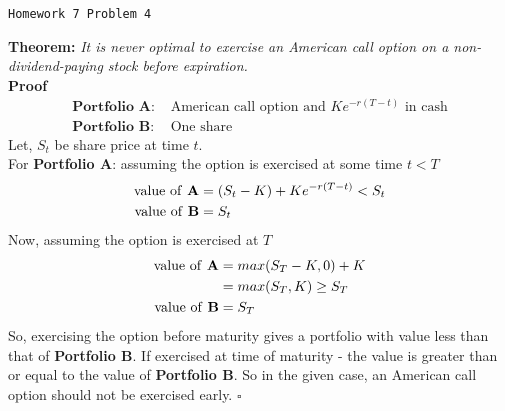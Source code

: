 \documentclass[12pt]{article}
\newcommand*{\QEDA}{\null\nobreak\hfill\ensuremath{\square}}
\begin{document}
	\begin{center}
        \Large{\texttt{Homework 7 Problem 4}} \vspace*{0.8mm}  
	\end{center}
    \textbf{Theorem:} \textit{It is never optimal to exercise an American call option on a non-dividend-paying stock before expiration.}\\

    \textbf{Proof} 
    \begin{align*}
        \textbf{Portfolio A: } & \text{American call option and } Ke^{-r(T-t)} \text{ in cash} \\
        \textbf{Portfolio B: } & \text{One share}
    \end{align*}
    Let, $S_t$ be share price at time $t$. \\

    For \textbf{Portfolio A}: assuming the option is exercised at some time $t < T$ 
    \begin{align*}
       \text{value of \textbf{A}} &= ( S_t - K ) + Ke^{-r(T-t)} < S_t \\
       \text{value of \textbf{B}} &= S_t
    \end{align*}
    Now, assuming the option is exercised at $T$
    \begin{align*}
       \text{value of \textbf{A}} &= max( S_T - K, 0 ) + K  \\
                                  &= max(S_T, K) \geq S_T \\
       \text{value of \textbf{B}} &= S_T
    \end{align*}
    So, exercising the option before maturity gives a portfolio with value less than that of \textbf{Portfolio B}. If exercised at time of maturity - the value is greater than or equal to the value of \textbf{Portfolio B}. So in the given case, an American call option should not be exercised early.
    \QEDA

    \clearpage
\end{document}
